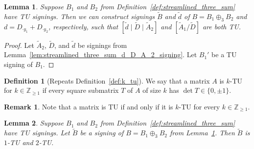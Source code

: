 \documentclass{article}
\newtheorem{lemma}{Lemma}
\theoremstyle{definition}
\newtheorem{definition}{Definition}
\newtheorem{remark}{Remark}
\begin{document}
\begin{lemma}\label{lem:streamlined_three_sum_B_d_signing}
    Suppose $B_{1}$ and $B_{2}$ from Definition~\ref{def:streamlined_three_sum} have TU signings. Then we can construct signings $\tilde{B}$ and $\tilde{d}$ of $B = B_{1} \oplus_{3} B_{2}$ and $d = D_{\cdot y_{1}} + D_{\cdot y_{2}}$, respectively, such that $[\tilde{d} \mid \tilde{D} \mid \tilde{A}_{2}]$ and $[\tilde{A}_{1} / \tilde{D}]$ are both TU.
\end{lemma}

\begin{proof}
    Let $\tilde{A}_{2}$, $\tilde{D}$, and $\tilde{d}$ be signings from Lemma~\ref{lem:streamlined_three_sum_d_D_A_2_signing}. Let $B_{1}'$ be a TU signing of $B_{1}$.
\end{proof}

\begin{definition}[Repeats Definition~\ref{def:k_tu}]\label{def:streamlined_three_sum_k_tu}
    We say that a matrix $A$ is $k$-TU for $k \in \mathbb{Z}_{\geq 1}$ if every square submatrix $T$ of $A$ of size $k$ has $\det T \in \{0, \pm 1\}$.
\end{definition}

\begin{remark}
    Note that a matrix is TU if and only if it is $k$-TU for every $k \in \mathbb{Z}_{\geq 1}$.
\end{remark}

\begin{lemma}\label{lem:streamlined_three_sum_1_2_TU}
    Suppose $B_{1}$ and $B_{2}$ from Definition~\ref{def:streamlined_three_sum} have TU signings. Let $\tilde{B}$ be a signing of $B = B_{1} \oplus_{3} B_{2}$ from Lemma~\ref{lem:streamlined_three_sum_B_d_signing}. Then $\tilde{B}$ is $1$-TU and $2$-TU.
\end{lemma}
\end{document}
